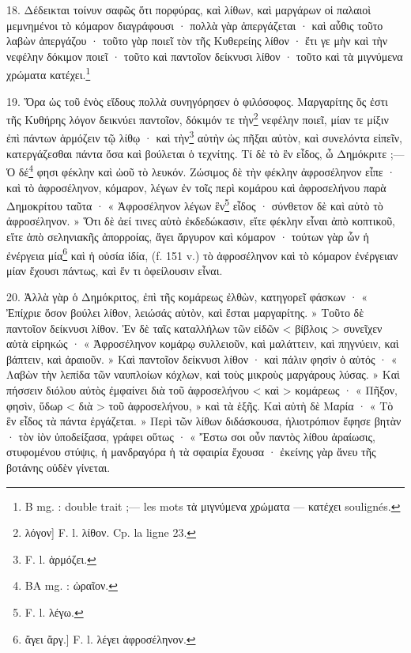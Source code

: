 \documentclass[a4paper, 11pt, oneside, polutonikogreek, french]{article}
\begin{document}
18. Δέδεικται τοίνυν σαφῶς ὅτι πορφύρας, καὶ λίθων, καὶ μαργάρων οἱ παλαιοὶ μεμνημένοι τὸ κόμαρον διαγράφουσι · πολλὰ γὰρ ἀπεργάζεται · καὶ αὖθις τοῦτο λαβὼν ἀπεργάζου · τοῦτο γὰρ ποιεῖ τὸν τῆς Κυθερείης λίθον · ἔτι γε μὴν καὶ τὴν νεφέλην δόκιμον ποιεῖ · τοῦτο καὶ παντοῖον δείκνυσι λίθον · τοῦτο καὶ τὰ μιγνύμενα χρώματα κατέχει.\footnote{B mg. : double trait ;--- les mots τὰ μιγνύμενα χρώματα --- κατέχει soulignés.}

19. Ὅρα ὡς τοῦ ἑνὸς εἴδους πολλὰ συνηγόρησεν ὁ φιλόσοφος. Μαργαρίτης ὅς ἐστι τῆς Κυθήρης λόγον δεικνύει παντοῖον, δόκιμόν τε τὴν\footnote{λόγον] F. l. λίθον. Cp. la ligne 23.} νεφέλην ποιεῖ, μίαν τε μίξιν ἐπὶ πάντων ἁρμόζειν τῷ λίθῳ · καὶ τὴν\footnote{F. l. ἁρμόζει.} αὐτὴν ὡς πῆξαι αὐτὸν, καὶ συνελόντα εἰπεῖν, κατεργάζεσθαι πάντα ὅσα καὶ βούλεται ὁ τεχνίτης. Τί δὲ τὸ ἓν εἶδος, ὦ Δημόκριτε ;--- Ὁ δέ\footnote{BA mg. : ὡραῖον.} φησι φέκλην καὶ ὠοῦ τὸ λευκόν. Ζώσιμος δὲ τὴν φέκλην ἀφροσέληνον εἶπε · καὶ τὸ ἀφροσέληνον, κόμαρον, λέγων ἐν τοῖς περὶ κομάρου καὶ ἀφροσελήνου παρὰ Δημοκρίτου ταῦτα · « Ἀφροσέληνον λέγων ἓν\footnote{F. l. λέγω.} εἶδος · σύνθετον δὲ καὶ αὐτὸ τὸ ἀφροσέληνον. » Ὅτι δὲ ἀεί τινες αὐτὸ ἐκδεδώκασιν, εἴτε φέκλην εἶναι ἀπὸ κοπτικοῦ, εἴτε ἀπὸ σεληνιακῆς ἀπορροίας, ἄγει ἄργυρον καὶ κόμαρον · τούτων γὰρ ὧν ἡ ἐνέργεια μία\footnote{ἄγει ἄργ.] F. l. λέγει ἀφροσέληνον.} καὶ ἡ οὐσία ἰδία, (f. 151 v.) τὸ ἀφροσέληνον καὶ τὸ κόμαρον ἐνέργειαν μίαν ἔχουσι πάντως, καὶ ἕν τι ὀφείλουσιν εἶναι.

20. Ἀλλὰ γὰρ ὁ Δημόκριτος, ἐπὶ τῆς κομάρεως ἐλθὼν, κατηγορεῖ φάσκων · « Ἐπίχριε ὅσον βούλει λίθον, λειώσάς αὐτὸν, καὶ ἔσται μαργαρίτης. » Τοῦτο δὲ παντοῖον δείκνυσι λίθον. Ἐν δὲ ταῖς καταλλήλων τῶν εἰδῶν < βίβλοις > συνεῖχεν αὐτὰ εἰρηκώς · « Ἀφροσέληνον κομάρῳ συλλειοῦν, καὶ μαλάττειν, καὶ πηγνύειν, καὶ βάπτειν, καὶ ἀραιοῦν. » Καὶ παντοῖον δείκνυσι λίθον · καὶ πάλιν φησὶν ὁ αὐτός · « Λαβὼν τὴν λεπίδα τῶν ναυπλοίων κόχλων, καὶ τοὺς μικροὺς μαργάρους λύσας. » Καὶ πήσσειν διόλου αὐτὸς ἐμφαίνει διὰ τοῦ ἀφροσελήνου < καὶ > κομάρεως · « Πῆξον, φησὶν, ὕδωρ < διὰ > τοῦ ἀφροσελήνου, » καὶ τὰ ἑξῆς. Καὶ αὐτὴ δὲ Μαρία · « Τὸ ἓν εἶδος τὰ πάντα ἐργάζεται. » Περὶ τῶν λίθων διδάσκουσα, ἡλιοτρόπιον ἔφησε βητὰν · τὸν ἰὸν ὑποδείξασα, γράφει οὕτως · « Ἔστω σοι οὖν παντὸς λίθου ἀραίωσις, στυφομένου στύψις, ἡ μανδραγόρα ἡ τὰ σφαιρία ἔχουσα · ἐκείνης γὰρ ἄνευ τῆς βοτάνης οὐδὲν γίνεται.
\end{document}
